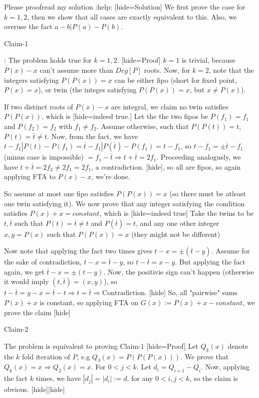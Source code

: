 \begin{solution}
	Please proofread my solution :help:
[hide=Solution] We first prove the case for $k =1,2$, then we show that all cases are exactly equivalent to this. Also, we overuse the fact $a-b | P(a) -P(b)$.

\begin{bolded}Claim-1\end{bolded}: The problem holds true for $k=1,2$.
[hide=Proof] $k=1$ is trivial, because $P(x)-x$ can't assume more than $Deg[P]$ roots. Now, for $k=2$, note that the integers satisfying $P(P(x)) = x$ can be either fipo (short for fixed point, $P(x) = x$), or twin (the integes satisfying $P(P(x)) = x$, but $x \neq P(x)$). 

If two distinct roots of $P(x)-x$ are integral, we claim no twin satisfies $P(P(x))$, which is [hide=indeed true.] Let the the two fipos be $P(f_1) = f_1$ and $P(f_2) = f_2$ with $f_1 \neq f_2$. Assume otherwise, such that $P(P(t)) = t$, $P(t) = \bar{t} \neq t$. Now, from the fact, we have $t-f_1 | P(t) - P(f_1) = \bar{t} - f_1 | P(\bar{t}) - P(f_1) = t-f_1$, so $t-f_1 = \pm {\bar{t} - f_1}$ (minus case is impossible) $ = f_1 - \bar{t} \Rightarrow t + \bar{t} = 2f_1$. Proceeding analogusly, we have $t + \bar{t} = 2f_2 \neq 2f_1 = 2f_1$, a contradiction. [\/hide], so all are fipos, so again applying FTA to $P(x)-x$, we're done.

So assume at most one fipo satisfies $P(P(x)) = x$ (so there must be atleast one twin satisfying it). We now prove that any integer satisfying the condition satisfies $P(x)+x = constant$, which is [hide=indeed true] Take the twins to be $t, \bar{t}$ such that $P(t) = \bar{t} \neq t$ and $P(\bar{t}) = t$, and any one other integer $x, y = P(x)$ such that $P(P(x)) = x$ (they might not be different)

Now note that applying the fact two times gives $t-x = \pm (\bar{t}-y)$. Assume for the sake of contradiction, $t-x = \bar{t} - y$, so $t - \bar{t} = x-y$. But applying the fact again, we get $\bar{t} -x = \pm(t - y)$.  Now, the positivie sign can't happen (otherwise it would imply $(t, \bar{t}) = (x,y)$), so $t - \bar{t} = y-x = \bar{t} - t \Rightarrow t = \bar{t} \Rightarrow \text{Contradiction}$. [\/hide] So, all "pairwise" sums $P(x)+x$ is constant, so applying FTA on $G(x) := P(x)+x-constant$, we prove the claim [\/hide]

\begin{bolded} Claim-2 \end{bolded}  The problem is equivalent to proving Claim-1
[hide=Proof] Let $Q_k(x)$ denote the $k$ fold iteration of $P$, e.g $Q_3(x) = P(P(P(x)))$.  We prove that $Q_k(x) = x \Rightarrow Q_2(x) = x$. For $0<j<k$. Let $d_i = Q_{i+1} - Q_{ i}$. Now, applying the fact $k$ times, we have $|d_j| = |d_i| := d $, for any $0 < i, j <k$, so the claim is obvious. [\/hide][\/hide]
\end{solution}



